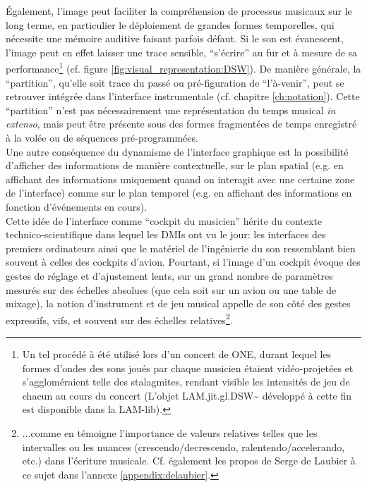 \indent Également, l'image peut faciliter la compréhension de processus musicaux sur le long terme, en particulier le déploiement de grandes formes temporelles, qui nécessite une mémoire auditive faisant parfois défaut. Si le son est évanescent, l'image peut en effet laisser une trace sensible, ``s'écrire'' au fur et à mesure de sa performance\footnote{Un tel procédé à été utilisé lors d'un concert de ONE, durant lequel les formes d'ondes des sons joués par chaque musicien étaient vidéo-projetées et s'aggloméraient telle des stalagmites, rendant visible les intensités de jeu de chacun au cours du concert (L'objet LAM.jit.gl.DSW\textasciitilde{} développé à cette fin est disponible dans la LAM-lib).} (cf. figure \ref{fig:visual_representation:DSW}). De manière générale, la ``partition'', qu'elle soit trace du passé ou pré-figuration de ``l'à-venir'', peut se retrouver intégrée dans l'interface instrumentale (cf. chapitre \ref{ch:notation}). Cette ``partition'' n'est pas nécessairement une représentation du temps musical \textit{in extenso}, mais peut être présente sous des formes fragmentées de temps enregistré à la volée ou de séquences pré-programmées.\\
\indent Une autre conséquence du dynamisme de l'interface graphique est la possibilité d'afficher des informations de manière contextuelle, sur le plan spatial (e.g. en affichant des informations uniquement quand on interagit avec une certaine zone de l'interface) comme sur le plan temporel (e.g. en affichant des informations en fonction d'événements en cours).\\
\indent Cette idée de l'interface comme ``cockpit du musicien'' \cite{vertegaal_towards_1996} hérite du contexte technico-scientifique dans lequel les \glspl{DMI} ont vu le jour: les interfaces des premiers ordinateurs ainsi que le matériel de l'ingénierie du son ressemblant bien souvent à celles des cockpits d'avion. Pourtant, si l'image d'un cockpit évoque des gestes de réglage et d'ajustement lents, sur un grand nombre de paramètres mesurés sur des échelles absolues (que cela soit sur un avion ou une table de mixage), la notion d'instrument et de jeu musical appelle de son côté des gestes expressifs, vifs, et souvent sur des échelles relatives\footnote{...comme en témoigne l'importance de valeurs relatives telles que les intervalles ou les nuances (crescendo/decrescendo, ralentendo/accelerando, etc.) dans l'écriture musicale. Cf. également les propos de Serge de Laubier à ce sujet dans l'annexe \ref{appendix:delaubier}.}.


